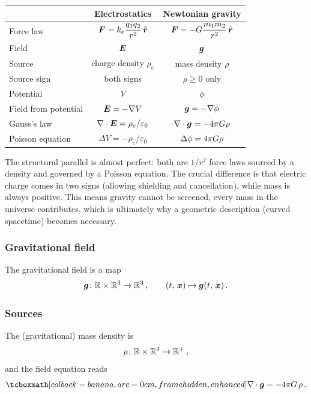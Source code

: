 \begin{center}
\small
\begin{tabular}{@{}lcc@{}}
  \toprule
  & \textbf{Electrostatics} & \textbf{Newtonian gravity} \\
  \midrule
  Force law
    & $\displaystyle\boldsymbol{F} = k_e\frac{q_1 q_2}{r^2}\,\hat{\boldsymbol{r}}$
    & $\displaystyle\boldsymbol{F} = -G\frac{m_1 m_2}{r^2}\,\hat{\boldsymbol{r}}$ \\[10pt]
  Field
    & $\boldsymbol{E}$
    & $\boldsymbol{g}$  \\[4pt]
  Source
    & charge density $\rho_e$
    & mass density $\rho$ \\[4pt]
  Source sign
    & both signs
    & $\rho \geq 0$ only \\[4pt]
  Potential
    & $V$
    & $\phi$  \\[4pt]
  Field from potential
    & $\boldsymbol{E} = -\nabla V$
    & $\boldsymbol{g} = -\nabla\phi$ \\[4pt]
  Gauss's law
    & $\nabla\cdot\boldsymbol{E} = \rho_e/\varepsilon_0$
    & $\nabla\cdot\boldsymbol{g} = -4\pi G\rho$ \\[4pt]
  Poisson equation
    & $\Delta V = -\rho_e/\varepsilon_0$
    & $\Delta\phi = 4\pi G\rho$ \\[4pt]
  \bottomrule
\end{tabular}
\end{center}

\begin{intuition}
  The structural parallel is almost perfect: both are
  $1/r^2$ force laws sourced by a density and governed by a Poisson
  equation.  The crucial difference is that electric charge comes in
  two signs (allowing shielding and cancellation), while mass is always
  positive.  This means gravity cannot be screened, every mass in the
  universe contributes, which is ultimately why a geometric description
  (curved spacetime) becomes necessary.
\end{intuition}

\subsubsection{Gravitational field}
The gravitational field is a map
\[
  \boldsymbol{g}\colon \mathbb{R}\times\mathbb{R}^{3} \to \mathbb{R}^{3}\,,\qquad
  (t,\,\boldsymbol{x}) \mapsto \boldsymbol{g}(t,\,\boldsymbol{x})\,.
\]

\subsubsection{Sources}
The (gravitational) mass density is
\[
  \rho\colon \mathbb{R}\times\mathbb{R}^{3} \to \mathbb{R}^+\,,
\]
and the field equation reads
\begin{equation}\label{eq:gauss-grav}
  \eqbox{\nabla\cdot\vb{g} = -4\pi\grav\,\rho\,.}
\end{equation}

